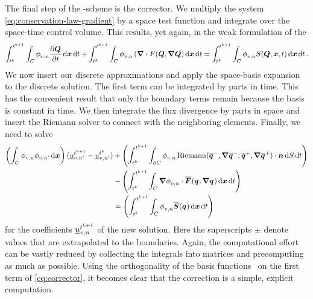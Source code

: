 The final step of the \aderdg{}-scheme is the corrector.
We multiply the system \cref{eq:conservation-law-gradient} by a space test function and integrate over the space-time control volume.
This results, yet again, in the weak formulation of the \pde{}
\begin{equation}
  \label{eq:weak-pde}
\intdt{\intdcell{
\stestfunction[][v,n] \pdv{\Q}{t}
}}
+
\intdt{\intdcell{
    \stestfunction[][v,n] \left( \div{F(\Q, \gradQ } \right)
}}
=
\intdt{\intdcell{
    \stestfunction[][v,n] S(\Q, \bm{x}, t)
}}.
\end{equation}
We now insert our discrete approximations and apply the space-basis expansion~ to the discrete solution.
The first term can be integrated by parts in time.
This has the convenient result that only the boundary terms remain because the basis is constant in time.
We then integrate the flux divergence by parts in space and insert the Riemann solver to connect with the neighboring elements.
Finally, we need to solve
\newcommand{\massMatrixDef}{\intdcell{
  \stestfunction[][v,n] \sbasis[][v,n']
}}%
\begin{align}
\begin{split}
\label{eq:corrector}
\left(
\massMatrixDef
\right)
(\ssolCoeff[\nextTime][v,n'] - \ssolCoeff[\curTime][v,n'])
&+
\left(\intdt{\intdcellb{
      \stestfunction[][v,n] \Riemann(\stpredictor[-], \gradient{\stpredictor[-]}; \stpredictor[+], \gradient{\stpredictor[+]}) \cdot \normal
}}\right)
\\&-
\left(\intdt{\intdcell{
    \gradient{\stestfunction[][v,n]} \cdot  \stflux(\spredictor, \gradient{\spredictor})
}}\right)
\\&=
\left(\intdt{\intdcell{
      \stestfunction[][v,n] \stsource(\spredictor)
}}\right)
\end{split}
\end{align}
for the coefficients $\ssolCoeff[\nextTime][v,n]$ of the new solution.
Here the superscripts $\pm$ denote values that are extrapolated to the boundaries.
Again, the computational effort can be vastly reduced by collecting the integrals into matrices and precomputing as much as possible.
Using the orthogonality of the basis functions~ on the first term of \cref{eq:corrector}, it becomes clear that the correction is a simple, explicit computation.
